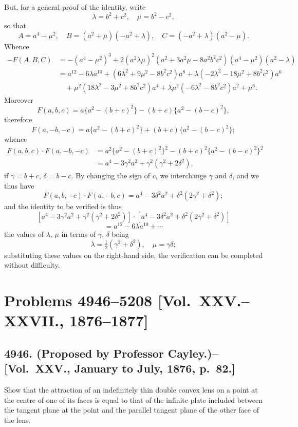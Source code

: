 \documentclass[11pt,a4paper]{book}
\begin{document}
\begin{solution}
But, for a general proof of the identity, write
\[
\lambda = b^2+c^2, \quad \mu = b^2-c^2,
\]
so that
\[
A = a^4-\mu^2, \quad B = (a^2+\mu)(-a^2+\lambda), \quad C = (-a^2+\lambda)(a^2-\mu).
\]
Whence
\[
\begin{aligned}
-F(A,B,C) &= -(a^4-\mu^2)^3 + 2(a^2\lambda\mu)^2(a^2+3a^2\mu-8a^2b^2c^2)(a^4-\mu^2)(a^2-\lambda) \\
&= a^{12} - 6\lambda a^{10} + (6\lambda^2+9\mu^2-8b^2c^2)a^8 + \lambda(-2\lambda^2-18\mu^2+8b^2c^2)a^6 \\
&\quad + \mu^2(18\lambda^2-3\mu^2+8b^2c^2)a^4 + \lambda\mu^2(-6\lambda^2-8b^2c^2)a^2 + \mu^6.
\end{aligned}
\]
Moreover
\[
F(a,b,c) = a\{a^2-(b+c)^2\} - (b+c)\{a^2-(b-c)^2\},
\]
therefore
\[
F(a,-b,-c) = a\{a^2-(b+c)^2\} + (b+c)\{a^2-(b-c)^2\};
\]
whence
\[
\begin{aligned}
F(a,b,c) \cdot F(a,-b,-c) &= a^2\{a^2-(b+c)^2\}^2 - (b+c)^2\{a^2-(b-c)^2\}^2 \\
&= a^4 - 3\gamma^2 a^2 + \gamma^2(\gamma^2+2\delta^2),
\end{aligned}
\]
if $\gamma = b+c$, $\delta = b-c$. By changing the sign of $c$, we interchange $\gamma$ and $\delta$, and we thus have
\[
F(a,b,-c) \cdot F(a,-b,c) = a^4 - 3\delta^2 a^2 + \delta^2(2\gamma^2+\delta^2);
\]
and the identity to be verified is thus
\[
[a^4 - 3\gamma^2 a^2 + \gamma^2(\gamma^2+2\delta^2)] \cdot [a^4 - 3\delta^2 a^2 + \delta^2(2\gamma^2+\delta^2)]
\]
\[
= a^{12} - 6\lambda a^{10} + \cdots
\]
the values of $\lambda$, $\mu$ in terms of $\gamma$, $\delta$ being
\[
\lambda = \tfrac{1}{2}(\gamma^2+\delta^2), \quad \mu = \gamma\delta;
\]
substituting these values on the right-hand side, the verification can be completed without difficulty.
\end{solution}

\newpage

\section*{Problems 4946--5208 [Vol.~XXV.--XXVII., 1876--1877]}

\subsection*{4946. (Proposed by Professor Cayley.)\---[Vol.~XXV., January to July, 1876, p.~82.]}

Show that the attraction of an indefinitely thin double convex lens on a point at the centre of one of its faces is equal to that of the infinite plate included between the tangent plane at the point and the parallel tangent plane of the other face of the lens.
\end{document}
